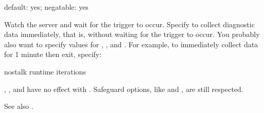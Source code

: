 \documentclass[letterpaper,10pt,english]{sphinxmanual}
\begin{document}
\begin{fulllineitems}
\label{\detokenize{mariadb-stat:cmdoption-mariadb-stat-stalk}}
default: yes; negatable: yes

Watch the server and wait for the trigger to occur.  Specify 
to collect diagnostic data immediately, that is, without waiting for the
trigger to occur.  You probably also want to specify values for
{\hyperref[\detokenize{mariadb-stat:cmdoption-mariadb-stat-interval}]{}}, {\hyperref[\detokenize{mariadb-stat:cmdoption-mariadb-stat-iterations}]{}}, and {\hyperref[\detokenize{mariadb-stat:cmdoption-mariadb-stat-sleep}]{}}.  For example, to
immediately collect data for 1 minute then exit, specify:

\begin{sphinxVerbatim}[commandchars=\\\{\}]
\PYGZhy{}\PYGZhy{}no\PYGZhy{}stalk \PYGZhy{}\PYGZhy{}run\PYGZhy{}time  \PYGZhy{}\PYGZhy{}iterations 
\end{sphinxVerbatim}

{\hyperref[\detokenize{mariadb-stat:cmdoption-mariadb-stat-cycles}]{}}, {\hyperref[\detokenize{mariadb-stat:cmdoption-mariadb-stat-daemonize}]{}}, {\hyperref[\detokenize{mariadb-stat:cmdoption-mariadb-stat-log}]{}} and {\hyperref[\detokenize{mariadb-stat:cmdoption-mariadb-stat-pid}]{}} have no effect
with .  Safeguard options, like {\hyperref[\detokenize{mariadb-stat:cmdoption-mariadb-stat-disk-bytes-free}]{}} and
{\hyperref[\detokenize{mariadb-stat:cmdoption-mariadb-stat-disk-pct-free}]{}}, are still respected.

See also {\hyperref[\detokenize{mariadb-stat:cmdoption-mariadb-stat-collect}]{}}.

\end{fulllineitems}
\end{document}
